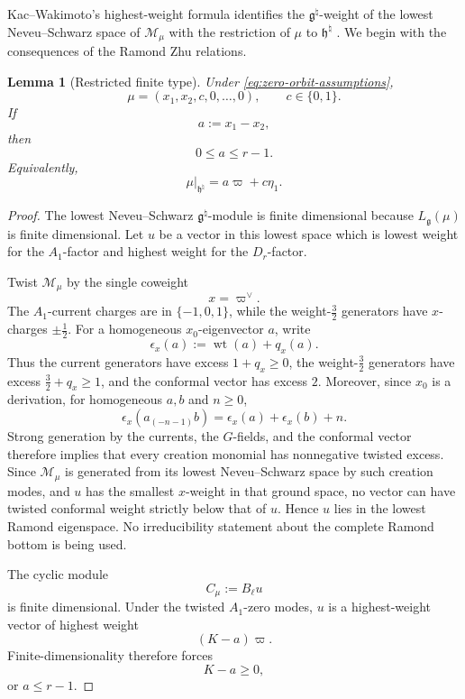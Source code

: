 \documentclass[11pt]{amsart}
\newtheorem{lemma}[theorem]{Lemma}
\theoremstyle{remark}
\numberwithin{equation}{section}
\begin{document}
Kac--Wakimoto's highest-weight formula identifies the
\(\mathfrak g^\natural\)-weight of the lowest Neveu--Schwarz space of
\(\mathcal M_\mu\) with the restriction of \(\mu\) to
\(\mathfrak h^\natural\)
\cite[Theorem~6.3]{KacWakimoto2004}.  We begin with the consequences of the Ramond Zhu relations.

\begin{lemma}[Restricted finite type]
\label{lem:zero-orbit-restricted-type}
Under \eqref{eq:zero-orbit-assumptions},
\[
   \mu
   =
   (x_1,x_2,c,0,\ldots,0),
   \qquad
   c\in\{0,1\}.
\]
If
\[
   a:=x_1-x_2,
\]
then
\[
   0\le a\le r-1.
\]
Equivalently,
\[
   \mu|_{\mathfrak h^\natural}
   =
   a\varpi+c\eta_1.
\]
\end{lemma}

\begin{proof}
The lowest Neveu--Schwarz \(\mathfrak g^\natural\)-module is finite
dimensional because \(L_{\mathfrak g}(\mu)\) is finite dimensional.  Let
\(u\) be a vector in this lowest space which is lowest weight for the
\(A_1\)-factor and highest weight for the \(D_r\)-factor.

Twist \(\mathcal M_\mu\) by the single coweight
\[
   x=\varpi^\vee.
\]
The \(A_1\)-current charges are in \(\{-1,0,1\}\), while the
weight-\(\frac32\) generators have \(x\)-charges \(\pm\frac12\).
For a homogeneous \(x_0\)-eigenvector \(a\), write
\[
   \epsilon_x(a):=\operatorname{wt}(a)+q_x(a).
\]
Thus the current generators have excess \(1+q_x\ge0\), the
weight-\(\frac32\) generators have excess
\(\frac32+q_x\ge1\), and the conformal vector has excess \(2\).
Moreover, since \(x_0\) is a derivation, for homogeneous \(a,b\) and
\(n\ge0\),
\[
   \epsilon_x\!\left(a_{(-n-1)}b\right)
   =\epsilon_x(a)+\epsilon_x(b)+n.
\]
Strong generation by the currents, the \(G\)-fields, and the conformal
vector therefore implies that every creation monomial has nonnegative
twisted excess.  Since \(\mathcal M_\mu\) is generated from its lowest
Neveu--Schwarz space by such creation modes, and \(u\) has the smallest
\(x\)-weight in that ground space, no vector can have twisted conformal
weight strictly below that of \(u\).  Hence \(u\) lies in the lowest
Ramond eigenspace.  No irreducibility statement about the complete
Ramond bottom is being used.

The cyclic module
\[
   C_\mu:=B_\ell u
\]
is finite dimensional.  Under the twisted \(A_1\)-zero modes,
\(u\) is a highest-weight vector of highest weight
\[
   (K-a)\varpi.
\]
Finite-dimensionality therefore forces
\[
   K-a\ge0,
\]
or \(a\le r-1\).


\end{proof}
\end{document}
